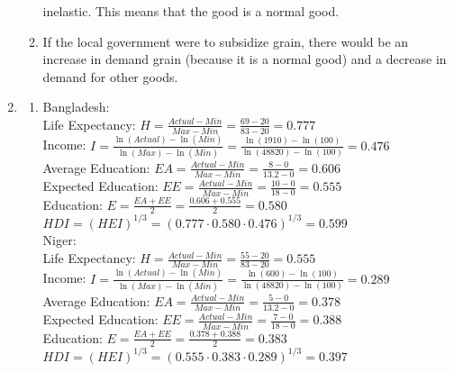 \documentclass[12pt]{amsart}
\begin{document}
\begin{enumerate}
\begin{enumerate}
            inelastic. This means that the good is a normal good.
        \item If the local government were to subsidize grain, there would
            be an increase in demand grain (because it is a normal good)
            and a decrease in demand for other goods.
    \end{enumerate}
    \item \begin{enumerate}
        \item   Bangladesh: \\
            Life Expectancy: $H = \frac{Actual-Min}{Max-Min} =
            \frac{69-20}{83-20} = 0.777$\\
            Income: $I = \frac{\ln(Actual)-\ln(Min)}{\ln(Max)-\ln(Min)} = 
            \frac{\ln(1910)-\ln(100)}{\ln(48820)-\ln(100)} = 0.476$\\
            Average Education: $EA = \frac{Actual-Min}{Max-Min} =
            \frac{8-0}{13.2-0} = 0.606$\\
            Expected Education: $EE = \frac{Actual-Min}{Max-Min} =
            \frac{10-0}{18-0} = 0.555$\\
            Education: $E = \frac{EA+EE}{2} =
            \frac{0.606+0.555}{2}=0.580$\\
            $HDI = (HEI)^{1/3} = (0.777 \cdot 0.580 \cdot 0.476)^{1/3} =
            0.599$\\

            Niger:\\
            Life Expectancy: $H = \frac{Actual-Min}{Max-Min} =
            \frac{55-20}{83-20} = 0.555$\\
            Income: $I = \frac{\ln(Actual)-\ln(Min)}{\ln(Max)-\ln(Min)} = 
            \frac{\ln(600)-\ln(100)}{\ln(48820)-\ln(100)} = 0.289$\\
            Average Education: $EA = \frac{Actual-Min}{Max-Min} =
            \frac{5-0}{13.2-0} = 0.378$\\
            Expected Education: $EE = \frac{Actual-Min}{Max-Min} =
            \frac{7-0}{18-0} = 0.388$\\
            Education: $E = \frac{EA+EE}{2} =
            \frac{0.378+0.388}{2}=0.383$\\
            $HDI = (HEI)^{1/3} = (0.555 \cdot 0.383 \cdot 0.289)^{1/3} =
            0.397$


\end{enumerate}
\end{enumerate}
\end{document}
